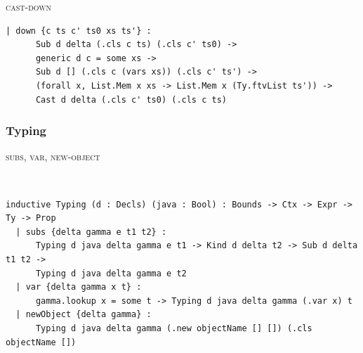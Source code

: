 \begin{cmp}{\textsc{cast-down}}
\begin{paperside}
\end{paperside}
\begin{leanside}
\begin{lstlisting}[style=leanside]
  | down {c ts c' ts0 xs ts'} :
      Sub d delta (.cls c ts) (.cls c' ts0) ->
      generic d c = some xs ->
      Sub d [] (.cls c (vars xs)) (.cls c' ts') ->
      (forall x, List.Mem x xs -> List.Mem x (Ty.ftvList ts')) ->
      Cast d delta (.cls c' ts0) (.cls c ts)
\end{lstlisting}
\end{leanside}
\end{cmp}

\subsubsection{Typing}

\begin{cmp}{\textsc{subs}, \textsc{var}, \textsc{new-object}}
\begin{paperside}
\\[1ex]
\qquad
\fit{$\inferrule{ }{
  \typing{\Delta}{\Gamma}{\obj{\Object}{}{}}{\gen{\Object}{}}
}$}
\end{paperside}
\begin{leanside}
\begin{lstlisting}[style=leanside]
inductive Typing (d : Decls) (java : Bool) : Bounds -> Ctx -> Expr -> Ty -> Prop
  | subs {delta gamma e t1 t2} :
      Typing d java delta gamma e t1 -> Kind d delta t2 -> Sub d delta t1 t2 ->
      Typing d java delta gamma e t2
  | var {delta gamma x t} :
      gamma.lookup x = some t -> Typing d java delta gamma (.var x) t
  | newObject {delta gamma} :
      Typing d java delta gamma (.new objectName [] []) (.cls objectName [])
\end{lstlisting}
\end{leanside}
\end{cmp}

